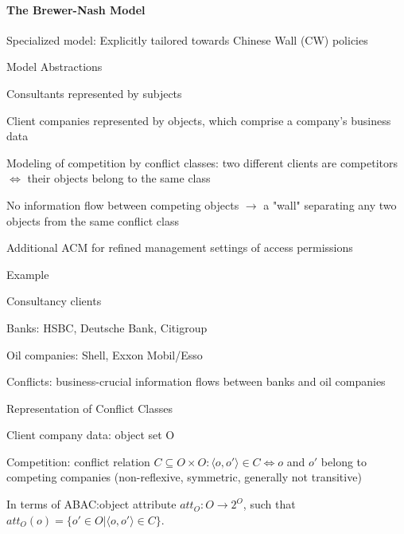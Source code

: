 \documentclass[a4paper]{article}
\begin{document}
\begin{multicols}{3}
    \paragraph{The Brewer-Nash Model}
    Specialized model: Explicitly tailored towards Chinese Wall (CW) policies

    Model Abstractions
    \begin{itemize*}
        \item Consultants represented by subjects
        \item Client companies represented by objects, which comprise a company’s business data
        \item Modeling of competition by conflict classes: two different clients are competitors $\Leftrightarrow$ their objects belong to the same class
        \item No information flow between competing objects $\rightarrow$ a "wall" separating any two objects from the same conflict class
        \item Additional ACM for refined management settings of access permissions
    \end{itemize*}

    Example
    \begin{itemize*}
        \item Consultancy clients
        \begin{itemize*}
            \item Banks: HSBC, Deutsche Bank, Citigroup
            \item Oil companies: Shell, Exxon Mobil/Esso
        \end{itemize*}
        \item Conflicts: business-crucial information flows between banks and oil companies
    \end{itemize*}

    Representation of Conflict Classes
    \begin{itemize*}
        \item Client company data: object set O
        \item Competition: conflict relation $C\subseteq O\times O:⟨o,o'⟩\in C\Leftrightarrow o$ and $o'$ belong to competing companies (non-reflexive, symmetric, generally not transitive)
        \item In terms of ABAC:object attribute $att_O:O\rightarrow 2^O$, such that $att_O(o)=\{o'\in O|⟨o,o'⟩\in C\}$.
    \end{itemize*}


\end{multicols}
\end{document}
